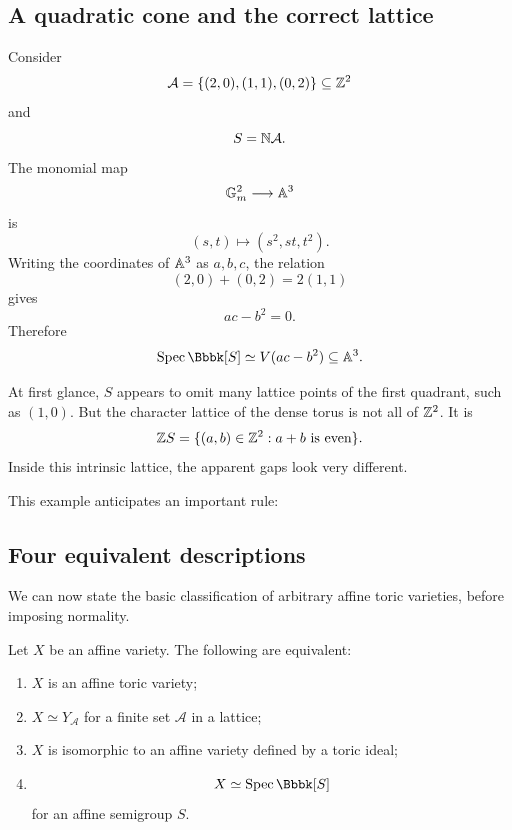 \subsection{A quadratic cone and the correct lattice}

Consider
\[
\mathcal A
=
\{(2,0),(1,1),(0,2)\}
\subseteq\mathbb{Z}^2
\]
and
\[
S=\mathbb{N}\mathcal A.
\]
The monomial map
\[
\mathbb{G}_{m}^2\longrightarrow\mathbb{A}^3
\]
is
\[
(s,t)\longmapsto(s^2,st,t^2).
\]
Writing the coordinates of \(\mathbb{A}^3\) as \(a,b,c\), the relation
\[
(2,0)+(0,2)=2(1,1)
\]
gives
\[
ac-b^2=0.
\]
Therefore
\[
\Spec\Bbbk[S]
\simeq
V(ac-b^2)\subseteq\AAA^3.
\]

At first glance, \(S\) appears to omit many lattice points of the
first quadrant, such as \((1,0)\). But the character lattice of the
dense torus is not all of \(\mathbb{Z}^2\). It is
\[
\mathbb{Z} S
=
\{(a,b)\in\mathbb{Z}^2:a+b\text{ is even}\}.
\]
Inside this intrinsic lattice, the apparent gaps look very different.

This example anticipates an important rule:

\begin{center}
\end{center}

\subsection{Four equivalent descriptions}

We can now state the basic classification of arbitrary affine toric
varieties, before imposing normality.

\begin{theorem}
\label{thm:equivalent-affine-toric-constructions}
Let \(X\) be an affine variety. The following are equivalent:
\begin{enumerate}[label=(\alph*),wide=0pt]
\item \(X\) is an affine toric variety;
\item \(X\simeq Y_{\mathcal A}\) for a finite set
\(\mathcal A\) in a lattice;
\item \(X\) is isomorphic to an affine variety defined by a toric
ideal;
\item
\[
X\simeq\Spec\Bbbk[S]
\]
for an affine semigroup \(S\).
\end{enumerate}
\end{theorem}

